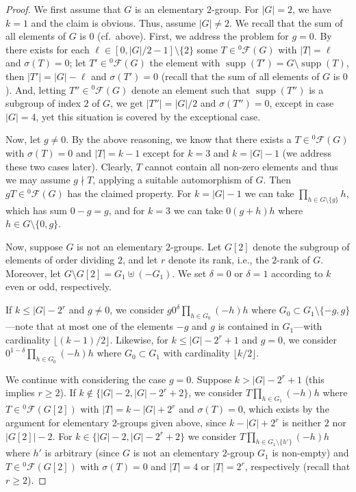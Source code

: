 \documentclass{amsart}
\theoremstyle{definition}
\numberwithin{equation}{section}
\begin{document}
\begin{proof}
We first assume that $G$ is an elementary $2$-group.
For $|G|=2$, we have $k=1$ and the claim is obvious. Thus, assume $|G|\neq 2$.
We recall that the sum of all elements of $G$ is $0$ (cf.~above).
First, we address the problem for $g=0$.
By \cite[Lemma 7.1]{GaoGe} there exists for each $\ell \in [0,|G|/2 -1]\setminus \{2\}$ some $T \in {{}^{{0}}\!\mathcal{F}}(G)$ with $|T|=\ell$ and  $\sigma(T)=0$; let $T' \in {{}^{{0}}\!\mathcal{F}}(G)$ the element with $\operatorname{supp}(T')=G \setminus \operatorname{supp}(T)$, then $|T'|=|G|-\ell$ and $\sigma(T')=0$ (recall that the sum of all elements of $G$ is $0$).
And, letting $T'' \in {{}^{{0}}\!\mathcal{F}}(G)$ denote an element such that $\operatorname{supp}(T'')$ is a subgroup of index $2$ of $G$, we get $|T''| = |G|/2$ and $\sigma(T'')=0$, except in case $|G|=4$, yet this situation is covered by the exceptional case.

Now, let $g \neq 0$.  By the above reasoning, we know that there exists a $T\in {{}^{{0}}\!\mathcal{F}}(G)$ with $\sigma(T)=0$ and $|T|=k-1$ except for $k=3$ and $k=|G|-1$ (we address these two cases later). Clearly, $T$ cannot contain all non-zero elements and thus we may assume $g \nmid T$, applying a suitable automorphism of $G$. Then $gT \in {{}^{{0}}\!\mathcal{F}}(G)$ has the claimed property.
For $k=|G|-1$ we can take $\prod_{h \in G \setminus \{g\}} h$, which has sum $0-g= g$, and
for $k=3$ we can take $0(g+h)h$ where $h \in G \setminus \{0,g\}$.

Now, suppose $G$ is not an elementary $2$-groups.
Let $G[2]$ denote the subgroup of elements of order dividing $2$, and let $r$ denote its rank, i.e., the $2$-rank of $G$. Moreover, let $G\setminus G[2] = G_1 \uplus (-G_1)$. We set $\delta=0$ or $\delta=1$ according to $k$ even or odd, respectively.

If $k \le |G| - 2^r$ and $g \neq 0$, we consider $g0^{\delta}\prod_{h\in G_0}(-h)h$
where $G_0 \subset G_1 \setminus \{-g,g\}$---note that at most one of the elements $-g$ and $g$ is contained in $G_1$---with cardinality $\lfloor (k-1)/2 \rfloor$.
Likewise, for $k \le |G| - 2^r + 1$ and $g = 0$, we consider
$0^{1-\delta}\prod_{h\in G_0}(-h)h$ where $G_0 \subset G_1$ with cardinality $ \lfloor k/2 \rfloor $.

We continue with considering the case $g=0$. Suppose $k > |G| - 2^r + 1$ (this implies $r \ge 2$).
If $k \notin \{ |G| - 2, |G| - 2^r + 2 \}$, we consider $T \prod_{h \in G_1}(-h)h$ where $T \in {{}^{{0}}\!\mathcal{F}}(G[2])$
with $|T|= k - |G| + 2^r$ and $\sigma(T)=0$, which exists by the argument for elementary $2$-groups given above, since $k - |G| + 2^r$ is neither $2$ nor $|G[2]| - 2$.
For $k \in \{|G| - 2, |G| - 2^r + 2\}$ we consider
$T \prod_{h \in G_1\setminus \{h'\}}(-h)h$ where $h'$ is arbitrary (since $G$ is not an elementary $2$-group $G_1$ is non-empty) and $T \in {{}^{{0}}\!\mathcal{F}}(G[2])$ with $\sigma(T)=0$ and $|T|=4$ or $|T|=2^r$, respectively (recall that $r\ge 2$).


\end{proof}
\end{document}

